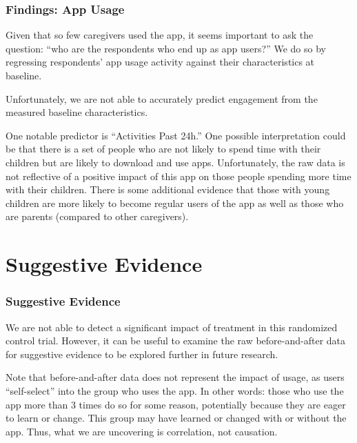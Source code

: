 \documentclass[aspectratio=169]{beamer}
\begin{document}
\begin{frame}
 \frametitle{Findings: App Usage}

Given that so few caregivers used the app, it seems important to ask the question: “who are the respondents who end up as app users?” We do so by regressing respondents’ app usage activity against their characteristics at baseline. 

Unfortunately, we are not able to accurately predict engagement from the measured baseline characteristics.

One notable predictor is ``Activities Past 24h.'' One possible interpretation could be that there is a set of people who are not likely to spend time with their children but are likely to download and use apps. Unfortunately, the raw data is not reflective of a positive impact of this app on those people spending more time with their children. There is some additional evidence that those with young children are more likely to become regular users of the app as well as those who are parents (compared to other caregivers). 
\end{frame}

\section{Suggestive Evidence}

\begin{frame}
  \frametitle{Suggestive Evidence}

We are not able to detect a significant impact of treatment in this randomized control trial. However, it can be useful to examine the raw before-and-after data for suggestive evidence to be explored further in future research. 

Note that before-and-after data does not represent the impact of usage, as users ``self-select'' into the group who uses the app. In other words: those who use the app more than 3 times do so for some reason, potentially because they are eager to learn or change. This group may have learned or changed with or without the app. Thus, what we are uncovering is correlation, not causation. 

\end{frame}
\end{document}
